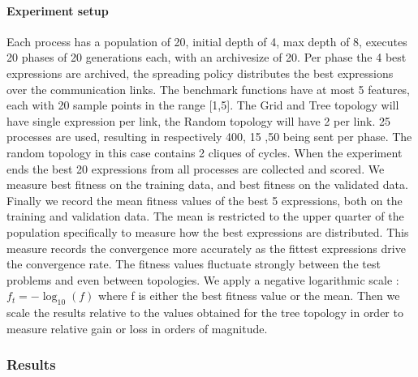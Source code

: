 \paragraph{Experiment setup}
Each process has a population of 20, initial depth of 4, max depth of 8, executes 20 phases of 20 generations each, with an archivesize of 20. Per phase the 4 best expressions are archived, the spreading policy distributes the best expressions over the communication links. The benchmark functions have at most 5 features, each with 20 sample points in the range [1,5]. The Grid and Tree topology will have single expression per link, the Random topology will have 2 per link. 25 processes are used, resulting in respectively 400, 15 ,50 being sent per phase. The random topology in this case contains 2 cliques of cycles.
When the experiment ends the best 20 expressions from all processes are collected and scored. We measure best fitness on the training data, and best fitness on the validated data. 
Finally we record the mean fitness values of the best 5 expressions, both on the training and validation data. The mean is restricted to the upper quarter of the population specifically to measure how the best expressions are distributed. This measure records the convergence more accurately as the fittest expressions drive the convergence rate. 
The fitness values fluctuate strongly between the test problems and even between topologies. We apply a negative logarithmic scale : $f_t = -\log_{10}(f)$ where f is either the best fitness value or the mean. Then we scale the results relative to the values obtained for the tree topology in order to measure relative gain or loss in orders of magnitude.
\subsubsection{Results}
